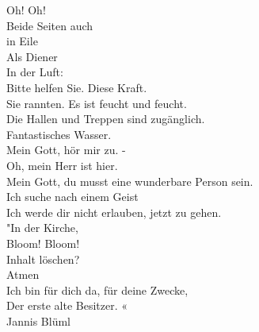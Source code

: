 {Oh! Oh! \\
Beide Seiten auch \\
in Eile \\
Als Diener \\
In der Luft: \\
Bitte helfen Sie. Diese Kraft. \\

Sie rannten. Es ist feucht und feucht. \\
Die Hallen und Treppen sind zugänglich. \\
Fantastisches Wasser. \\
Mein Gott, hör mir zu. - \\
Oh, mein Herr ist hier. \\
Mein Gott, du musst eine wunderbare Person sein. \\
Ich suche nach einem Geist \\
Ich werde dir nicht erlauben, jetzt zu gehen. \\

"In der Kirche, \\
Bloom! Bloom! \\
Inhalt löschen? \\
Atmen \\
Ich bin für dich da, für deine Zwecke, \\
Der erste alte Besitzer. « \\



}
{Jannis Blüml}
